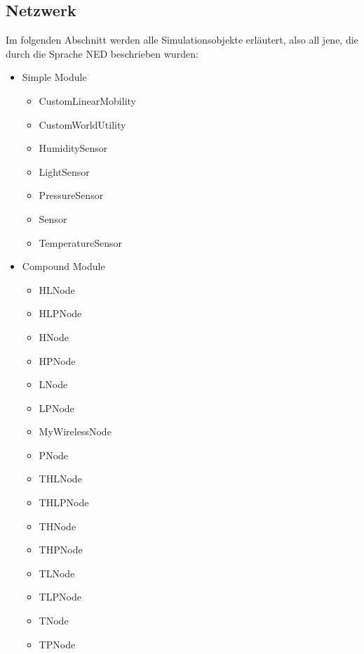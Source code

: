 \subsection{Netzwerk}

Im folgenden Abschnitt werden alle Simulationsobjekte erläutert, also all jene, die durch die Sprache NED beschrieben wurden:

\begin{itemize} 
\item Simple Module
\begin{multicols}{2}
\begin{itemize}
\item CustomLinearMobility
\item CustomWorldUtility  
\item HumiditySensor
\item LightSensor
\item PressureSensor
\item Sensor
\item TemperatureSensor 
\end{itemize}
\end{multicols}
\item Compound Module
\begin{multicols}{2}
\begin{itemize}
\item HLNode
\item HLPNode
\item HNode
\item HPNode
\item LNode
\item LPNode
\item MyWirelessNode
\item PNode
\item THLNode
\item THLPNode
\item THNode
\item THPNode
\item TLNode
\item TLPNode
\item TNode
\item TPNode 
\end{itemize}
\end{multicols}
\end{itemize}

